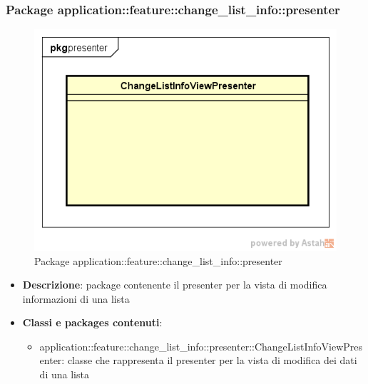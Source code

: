 \subsubsection{Package application::feature::change\_list\_info::presenter}
\label{Package application::feature::change_list_info::presenter}
\begin{figure}[H]
	\centering
	\includegraphics[scale=0.5]{Sezioni/Packages/Application/change_list_info_presenter.png}
	\caption{Package application::feature::change\_list\_info::presenter}
\end{figure}
\begin{itemize}
	\item \textbf{Descrizione}: package contenente il presenter per la vista di modifica informazioni di una lista
	\item \textbf{Classi e packages contenuti}:
	\begin{itemize}
	\item application::feature::change\_list\_info::presenter::ChangeListInfoViewPresenter: classe che rappresenta il presenter per la vista di modifica dei dati di una lista
	\end{itemize}
\end{itemize}


